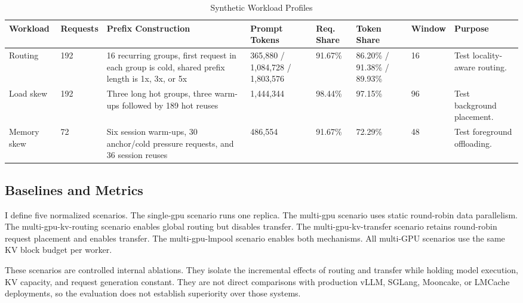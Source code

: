 \documentclass{article}
\begin{document}
\begin{table}[t]
  \centering
  \caption{Synthetic Workload Profiles}
  \label{tab:datasets}
  \scriptsize
  \setlength{\tabcolsep}{2pt}
  \renewcommand{\arraystretch}{1.08}
  \begin{tabular}{@{}L{0.08\textwidth}L{0.06\textwidth}L{0.22\textwidth}L{0.10\textwidth}L{0.07\textwidth}L{0.10\textwidth}L{0.05\textwidth}L{0.16\textwidth}@{}}
    \toprule
    Workload & Requests & Prefix Construction & Prompt Tokens & Req. Share & Token Share & Window & Purpose \\
    \midrule
    Routing & 192 & 16 recurring groups, first request in each group is cold, shared prefix length is 1x, 3x, or 5x & 365,880 / 1,084,728 / 1,803,576 & 91.67\% & 86.20\% / 91.38\% / 89.93\% & 16 & Test locality-aware routing. \\
    Load skew & 192 & Three long hot groups, three warm-ups followed by 189 hot reuses & 1,444,344 & 98.44\% & 97.15\% & 96 & Test background placement. \\
    Memory skew & 72 & Six session warm-ups, 30 anchor/cold pressure requests, and 36 session reuses & 486,554 & 91.67\% & 72.29\% & 48 & Test foreground offloading. \\
    \bottomrule
  \end{tabular}
\end{table}

\subsection{Baselines and Metrics}

I define five normalized scenarios. The single-gpu scenario runs one replica. The multi-gpu scenario uses static round-robin data parallelism. The multi-gpu-kv-routing scenario enables global routing but disables transfer. The multi-gpu-kv-transfer scenario retains round-robin request placement and enables transfer. The multi-gpu-lmpool scenario enables both mechanisms. All multi-GPU scenarios use the same KV block budget per worker.

These scenarios are controlled internal ablations. They isolate the incremental effects of routing and transfer while holding model execution, KV capacity, and request generation constant. They are not direct comparisons with production vLLM, SGLang, Mooncake, or LMCache deployments, so the evaluation does not establish superiority over those systems.
\end{document}
